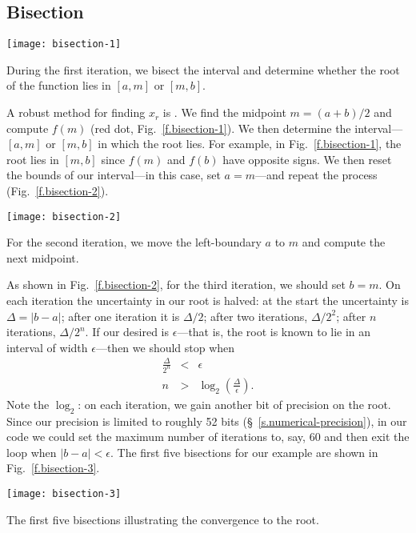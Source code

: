 \subsection{Bisection}
\begin{marginfigure}[-18\baselineskip]
\texttt{[image: bisection-1]}
\caption[First bisection step]{During the first iteration, we bisect the interval and determine whether the root of the function lies in $[a,m]$ or $[m,b]$.\label{f.bisection-1}}
\end{marginfigure}
A robust method for finding $x_{r}$ is . We find the midpoint $m = (a+b)/2$ and compute $f(m)$ (red dot, Fig.~\ref{f.bisection-1}). We then determine the interval---$[a,m]$ or $[m,b]$ in which the root lies. For example, in Fig.~\ref{f.bisection-1}, the root lies in $[m,b]$ since $f(m)$ and $f(b)$ have opposite signs. We then reset the bounds of our interval---in this case, set $a=m$---and repeat the process (Fig.~\ref{f.bisection-2}).
\begin{marginfigure}
\texttt{[image: bisection-2]}
\caption[Second bisection step]{For the second iteration, we move the left-boundary $a$ to $m$ and compute the next midpoint.\label{f.bisection-2}}
\end{marginfigure}

As shown in Fig.~\ref{f.bisection-2}, for the third iteration, we should set $b=m$. On each iteration the uncertainty in our root is halved: at the start the uncertainty is $\Delta=|b-a|$; after one iteration it is $\Delta/2$; after two iterations, $\Delta/2^{2}$; after $n$ iterations, $\Delta/2^{n}$. If our desired  is $\epsilon$---that is, the root is known to lie in an interval of width $\epsilon$---then we should stop when
\begin{eqnarray*}
	\frac{\Delta}{2^{n}} &<& \epsilon\\
	n &>& \log_{2}\left(\frac{\Delta}{\epsilon}\right).
\end{eqnarray*}
Note the $\log_{2}$: on each iteration, we gain another bit of precision on the root. Since our precision is limited to roughly 52 bits (\S~\ref{s.numerical-precision}), in our code we could set the maximum number of iterations to, say, 60 and then exit the loop when $|b-a| < \epsilon$. The first five bisections for our example are shown in Fig.~\ref{f.bisection-3}.
\begin{marginfigure}
\texttt{[image: bisection-3]}
\caption[First five bisections]{The first five bisections illustrating the convergence to the root.\label{f.bisection-3}}
\end{marginfigure}


